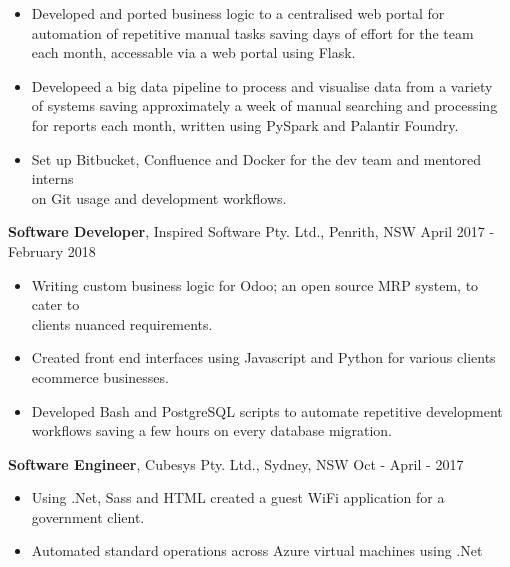 \documentclass[margin]{res}
\begin{document}
\begin{resume}
\begin{itemize}
\item Developed and ported business logic to a centralised web portal for \\
	automation of repetitive manual tasks saving days of effort for the team \\ 
		each month, accessable via a web portal using Flask. 

\item Developeed a big data pipeline to process and visualise data from a variety \\
	of systems saving approximately a week of manual searching and processing \\
		for reports each month, written using PySpark and Palantir Foundry.

\item Set up Bitbucket, Confluence and Docker for the dev team and mentored interns \\
	on Git usage and development workflows.
\end{itemize}

{\bf Software Developer}, 
	Inspired Software Pty. Ltd., Penrith, NSW \hfill April 2017 - February 2018
\begin{itemize} \itemsep 0pt  %
\item Writing custom business logic for Odoo; an open source MRP system, to cater to \\
	clients nuanced requirements.

\item  Created front end interfaces using Javascript and Python for various clients \\
	ecommerce businesses.

\item Developed Bash and PostgreSQL scripts to automate repetitive development \\
	workflows saving a few hours on every database migration.
\end{itemize}

 {\bf Software Engineer}, 
	Cubesys Pty. Ltd., Sydney, NSW \hfill Oct - April - 2017
 \begin{itemize} \itemsep 0pt  %
 \item Using .Net, Sass and HTML created a guest WiFi application for a \\
	 government client.
 \item Automated standard operations across Azure virtual machines using .Net
 \end{itemize}


\end{resume}
\end{document}
